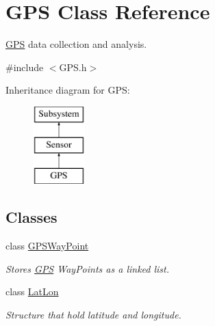 \hypertarget{classGPS}{\section{G\-P\-S Class Reference}
\label{classGPS}
}


\hyperlink{classGPS}{G\-P\-S} data collection and analysis.  




{\ttfamily \#include $<$G\-P\-S.\-h$>$}

Inheritance diagram for G\-P\-S\-:\begin{figure}[H]
\begin{center}
\leavevmode
\includegraphics[height=3.000000cm]{classGPS}
\end{center}
\end{figure}
\subsection*{Classes}
\begin{DoxyCompactItemize}
\item 
class \hyperlink{classGPS_1_1GPSWayPoint}{G\-P\-S\-Way\-Point}
\begin{DoxyCompactList}\small\item\em Stores \hyperlink{classGPS}{G\-P\-S} Way\-Points as a linked list. \end{DoxyCompactList}\item 
class \hyperlink{classGPS_1_1LatLon}{Lat\-Lon}
\begin{DoxyCompactList}\small\item\em Structure that hold latitude and longitude. \end{DoxyCompactList}\end{DoxyCompactItemize}
